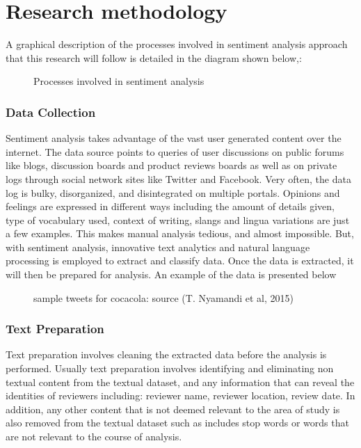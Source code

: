 \chapter{Research methodology}

A graphical description of the processes involved in sentiment analysis approach that this research will follow is detailed in the diagram shown below,\cite{ref21}:

\begin{figure}[h]
  \centering
  \caption[]
  {Processes involved in sentiment analysis}
  \label{fig:ALAP:sm3}
\end{figure}


\subsection{Data Collection}
Sentiment analysis takes advantage of the vast user generated content over the internet.
The data source points to queries of user discussions on public forums like blogs,
discussion boards and product reviews boards as well as on private logs through social
network sites like Twitter and Facebook. Very often, the data log is bulky, disorganized,
and disintegrated on multiple portals. Opinions and feelings are expressed in different ways
including the amount of details given, type of vocabulary used, context of writing, slangs
and lingua variations are just a few examples. This makes manual analysis tedious, and
almost impossible. But, with sentiment analysis, innovative text analytics and natural
language processing is employed to extract and classify data. Once the data is extracted, it
will then be prepared for analysis. An example of the data is presented below



\begin{figure}[h]
  \centering
  \caption[Example figure]%
  {sample tweets for cocacola: source (T. Nyamandi et al, 2015)}
  \label{fig:ALAP:sm1}
\end{figure}


\subsection{Text Preparation}
Text preparation involves cleaning the extracted data before the analysis is performed.
Usually text preparation involves identifying and eliminating non textual content from the
textual dataset, and any information that can reveal the identities of reviewers including:
reviewer name, reviewer location, review date. In addition, any other content that is not
deemed relevant to the area of study is also removed from the textual dataset such as
includes stop words or words that are not relevant to the course of analysis.

